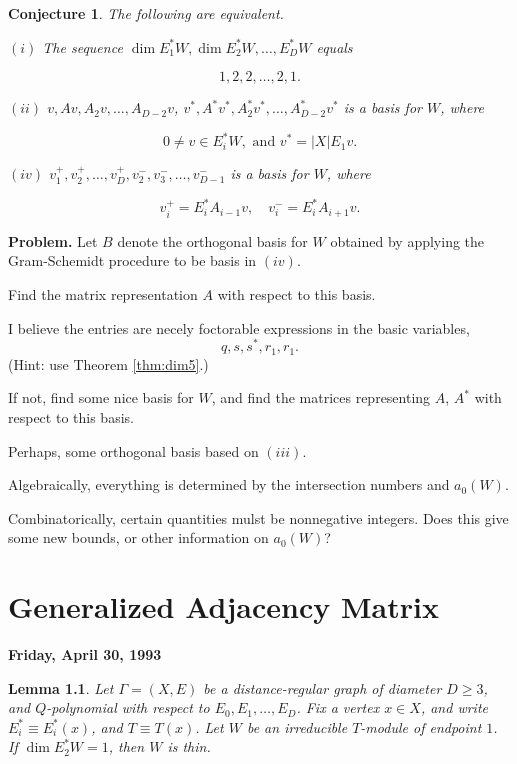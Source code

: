 \documentclass[
]{book}
\newtheorem{lemma}{Lemma}[chapter]
\newtheorem{conjecture}{Conjecture}[chapter]
\theoremstyle{definition}
\theoremstyle{definition}
\theoremstyle{definition}
\theoremstyle{definition}
\theoremstyle{remark}
\begin{document}
\begin{conjecture}
\protect\hypertarget{cnj:not-thin}{}\label{cnj:not-thin}The following are equivalent.

\((i)\) The sequence \(\dim E^*_1W, \dim E^*_2W, \ldots, E^*_DW\) equals

\[1, 2, 2, \ldots, 2, 1.\]

\((ii)\) \(v, Av, A_2v, \ldots, A_{D-2}v\), \(v^*, A^*v^*, A^*_2v^*, \ldots, A^*_{D-2}v^*\) is a basis for \(W\), where

\[0\neq v\in E^*_iW, \text{ and } v^* = |X|E_1v.\]

\((iv)\) \(v^+_1, v^+_2, \ldots, v^+_D, v^-_2, v^-_3, \ldots, v^-_{D-1}\) is a basis for \(W\), where

\[v^+_i = E^*_iA_{i-1}v, \quad v^-_i = E^*_iA_{i+1}v.\]
\end{conjecture}

\textbf{Problem.}
Let \(B\) denote the orthogonal basis for \(W\) obtained by applying the Gram-Schemidt procedure to be basis in \((iv)\).

Find the matrix representation \(A\) with respect to this basis.

I believe the entries are necely foctorable expressions in the basic variables,
\[q, s, s^*, r_1, r_1.\]
(Hint: use Theorem \ref{thm:dim5}.)

If not, find some nice basis for \(W\), and find the matrices representing \(A\), \(A^*\) with respect to this basis.

Perhaps, some orthogonal basis based on \((iii)\).

Algebraically, everything is determined by the intersection numbers and \(a_0(W)\).

Combinatorically, certain quantities mulst be nonnegative integers. Does this give some new bounds, or other information on \(a_0(W)\)?

\hypertarget{lec37}{%
\chapter{Generalized Adjacency Matrix}\label{lec37}}

\textbf{Friday, April 30, 1993}

\begin{lemma}
\protect\hypertarget{lem:1-thin-condition}{}\label{lem:1-thin-condition}Let \(\Gamma = (X, E)\) be a distance-regular graph of diameter \(D\geq 3\), and \(Q\)-polynomial with respect to \(E_0, E_1, \ldots, E_D\).
Fix a vertex \(x\in X\), and write \(E^*_i\equiv E^*_i(x)\), and \(T\equiv T(x)\). Let \(W\) be an irreducible \(T\)-module of endpoint \(1\). If \(\dim E^*_2W = 1\), then \(W\) is thin.
\end{lemma}
\end{document}
